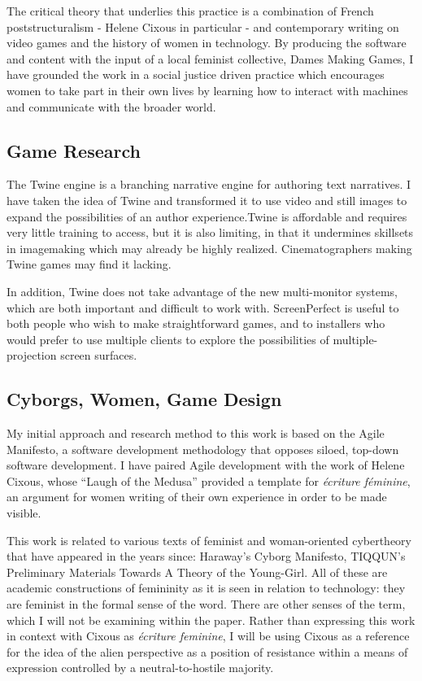 The critical theory that underlies this practice is a combination of French poststructuralism - Helene Cixous in particular - and contemporary writing on video games and the history of women in technology. By producing the software and content with the input of a local feminist collective, Dames Making Games, I have grounded the work in a social justice driven practice which encourages women to take part in their own lives by learning how to interact with machines and communicate with the broader world.

\subsection{Game Research}

The Twine engine is a branching narrative engine for authoring text narratives. I have taken the idea of Twine and transformed it to use video and still images to expand the possibilities of an author experience.Twine is affordable and requires very little training to access, but it is also limiting, in that it undermines skillsets in imagemaking which may already be highly realized. Cinematographers making Twine games may find it lacking.

In addition, Twine does not take advantage of the new multi-monitor systems, which are both important and difficult to work with. ScreenPerfect is useful to both people who wish to make straightforward games, and to installers who would prefer to use multiple clients to explore the possibilities of multiple-projection screen surfaces.

\subsection{Cyborgs, Women, Game Design}

My initial approach and research method to this work is based on the Agile Manifesto, a software development methodology that opposes siloed, top-down software development. I have paired Agile development with the work of Helene Cixous, whose “Laugh of the Medusa” provided a template for \textit{écriture féminine}, an argument for women writing of their own experience in order to be made visible.

This work is related to various texts of feminist and woman-oriented cybertheory that have appeared in the years since: Haraway’s Cyborg Manifesto, TIQQUN’s Preliminary Materials Towards A Theory of the Young-Girl. All of these are academic constructions of femininity as it is seen in relation to technology: they are feminist in the formal sense of the word. There are other senses of the term, which I will not be examining within the paper. Rather than expressing this work in context with Cixous as \textit{écriture feminine}, I will be using Cixous as a reference for the idea of the alien perspective as a position of resistance within a means of expression controlled by a neutral-to-hostile majority. 


